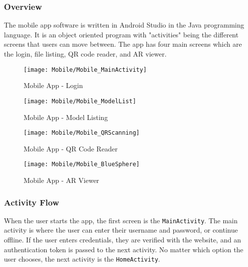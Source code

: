     \subsubsection{Overview}
        
        The mobile app software is written in Android Studio in the Java programming language. It is an object oriented program with "activities" being the different screens that users can move between. The app has four main screens which are the login, file listing, QR code reader, and AR viewer.
        
        \begin{figure}[H]
            \texttt{[image: Mobile/Mobile\_MainActivity]}
            \centering
            \caption{Mobile App - Login}
            \label{fig:mobileLoginActivity}
        \end{figure}

        \begin{figure}[H]
            \texttt{[image: Mobile/Mobile\_ModelList]}
            \centering
            \caption{Mobile App - Model Listing}
            \label{fig:mobileModelList}
        \end{figure}

        \begin{figure}[H]
            \texttt{[image: Mobile/Mobile\_QRScanning]}
            \centering
            \caption{Mobile App - QR Code Reader}
            \label{fig:mobileQRScanning}
        \end{figure}

        \begin{figure}[H]
            \texttt{[image: Mobile/Mobile\_BlueSphere]}
            \centering
            \caption{Mobile App - AR Viewer}
            \label{fig:mobileModelViewer}
        \end{figure}

        \subsubsection{Activity Flow}

            When the user starts the app, the first screen is the \texttt{MainActivity}.  The main activity is where the user can enter their username and password, or continue offline.  If the user enters credentials, they are verified with the website, and an authentication token is passed to the next activity.  No matter which option the user chooses, the next activity is the \texttt{HomeActivity}.


